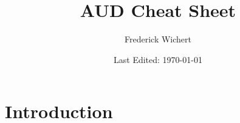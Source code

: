 


\begin{titlepage}
  \title{AUD Cheat Sheet} %
  \author{Frederick Wichert}
  \date{Last Edited: \today}
\end{titlepage}



	\maketitle
	
	\setcounter{secnumdepth}{2}
	\setcounter{tocdepth}{2}
	\tableofcontents
	
	\newpage



\section{Introduction}

 